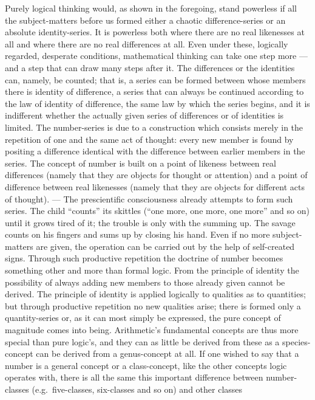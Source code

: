 \documentclass[12pt]{book}
\newcommand{\opage}[1]{\marginnote{\footnotesize\textit{[#1]}}}
\begin{document}
Purely logical thinking would, as shown in the \opage{81}foregoing, stand powerless if all
the subject-matters before us formed either a chaotic difference-series or an
absolute identity-series. It is powerless both where there are no real likenesses
at all and where there are no real differences at all. Even under these, logically
regarded, desperate conditions, mathematical thinking can take one step more ---
and a step that can draw many steps after it. The differences or the identities
can, namely, be counted; that is, a series can be formed between whose members
there is identity of difference, a series that can always be continued according
to the law of identity of difference, the same law by which the series begins,
and it is indifferent whether the actually given series of differences or of
identities is limited. The number-series is due to a construction which consists
merely in the repetition of one and the same act of thought: every new member is
found by positing a difference identical with the difference between earlier
members in the series. The concept of number is built on a point of likeness
between real differences (namely that they are objects for thought or attention)
and a point of difference between real likenesses (namely that they are objects
for different acts of thought). --- The prescientific consciousness already
attempts to form such series. The child ``counts'' its skittles (``one more, one
more, one more'' and so on) until it grows tired of it; the trouble is only with
the summing up. The savage counts on his fingers and sums up by closing his hand.
Even if no more subject-matters are given, the operation can be carried out by the
help of self-created signs. Through such productive repetition the doctrine of
number becomes something other and more than formal logic. From the principle of
identity the possibility of always adding new members to those already given
cannot be derived. The principle of identity is applied logically to \opage{82}qualities as
to quantities; but through productive repetition no new qualities arise; there is
formed only a quantity-series or, as it can most simply be expressed, the pure
concept of magnitude comes into being. Arithmetic's fundamental concepts are thus
more special than pure logic's, and they can as little be derived from these as a
species-concept can be derived from a genus-concept at all. If one wished to say
that a number is a general concept or a class-concept, like the other concepts
logic operates with, there is all the same this important difference between
number-classes (e.g.\ five-classes, six-classes and so on) and other classes
\end{document}
